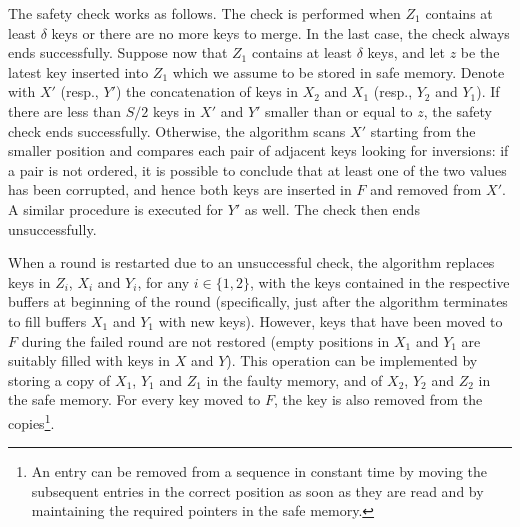 \documentclass[review,number]{elsarticle}
\newcommand{\X}{{X}}
\newcommand{\Y}{{Y}}
\newcommand{\Z}{{Z}}
\newcommand{\F}{{F}}
\begin{document}
The safety check works as follows. The check is performed when $\Z_1$
contains at least $\delta$ keys or there are no more keys to merge. In the last
case, the check always ends successfully. Suppose now that $\Z_1$ contains at
least $\delta$ keys, and let $z$ be the latest key inserted into $\Z_1$ which we
assume to be stored in safe memory. Denote with $\X'$ (resp., $\Y'$) the
concatenation of keys in $\X_2$ and $\X_1$ (resp., $\Y_2$ and $\Y_1$). If there
are less than $S/2$ keys in $\X'$ and $\Y'$  smaller than or equal to $z$, the
safety check ends successfully. Otherwise, the algorithm scans $\X'$ starting
from the smaller position and compares each pair of adjacent keys looking for
inversions: if a pair is not ordered, it is possible to conclude that at least
one of the two values has been corrupted, and hence both keys are  inserted in
$\F$ and removed from $\X'$.  A similar procedure is executed for $\Y'$ as well.
The check then ends unsuccessfully. 

When a round is restarted due to an unsuccessful check, 
the algorithm replaces keys in $\Z_i$, $\X_i$ and $\Y_i$, for any
$i\in \{1,2\}$, with the keys contained in the respective buffers at beginning
of the round (specifically, just after the algorithm terminates to fill
buffers $\X_1$ and $\Y_1$  with
new keys). However, keys
that have been moved to $F$ during the failed round are not restored
(empty positions in $\X_1$ and $\Y_1$ are suitably filled with keys in $X$
and $Y$). This operation can be implemented by storing a copy of $\X_1$, $\Y_1$
and $\Z_1$ in the faulty memory, and of $\X_2$, $\Y_2$ and $\Z_2$ in the safe
memory. For every key moved to $F$, the key is also removed from the
copies\footnote{An entry can be removed from a sequence in constant time by
moving the subsequent entries in the correct position as soon as they are read
and by maintaining the required pointers in the safe memory.}.
\end{document}
